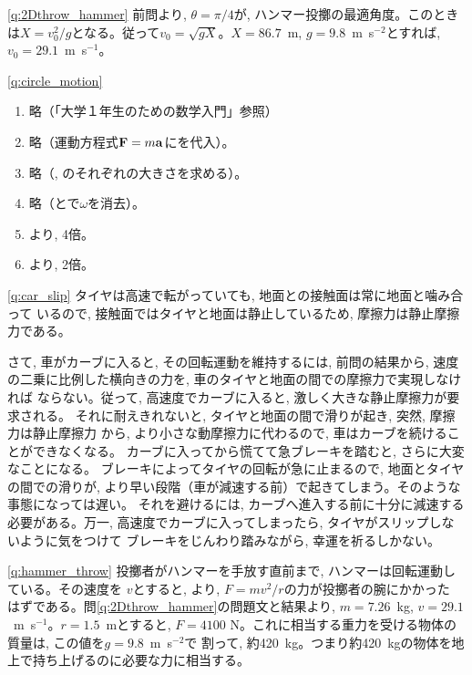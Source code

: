 \ref{q:2Dthrow_hammer}
前問より, $\theta=\pi/4$が, ハンマー投擲の最適角度。このとき
は$X=v_0^2/g$となる。従って$v_0=\sqrt{gX}$。$X=86.7$~m, 
$g=9.8$~m~s$^{-2}$とすれば, $v_0=29.1$~m~s$^{-1}$。
\mv


\ref{q:circle_motion}
\begin{enumerate}
\item 略（「大学１年生のための数学入門」参照）
\item 略（運動方程式${\bf F}=m{\bf a}$にを代入）。
\item 略（, のそれぞれの大きさを求める）。
\item 略（とで$\omega$を消去）。
\item {}より, 4倍。
\item {}より, 2倍。
\end{enumerate}
\mv

%
\ref{q:car_slip}
タイヤは高速で転がっていても, 地面との接触面は常に地面と噛み合って
いるので, 接触面ではタイヤと地面は静止しているため, 摩擦力は静止摩擦力である。

さて, 車がカーブに入ると, その回転運動を維持するには, 前問の結果から, 
速度の二乗に比例した横向きの力を, 車のタイヤと地面の間での摩擦力で実現しなければ
ならない。従って, 高速度でカーブに入ると, 激しく大きな静止摩擦力が要求される。
それに耐えきれないと, タイヤと地面の間で滑りが起き, 突然, 摩擦力は静止摩擦力
から, より小さな動摩擦力に代わるので, 車はカーブを続けることができなくなる。
カーブに入ってから慌てて急ブレーキを踏むと, さらに大変なことになる。
ブレーキによってタイヤの回転が急に止まるので, 地面とタイヤの間での滑りが, 
より早い段階（車が減速する前）で起きてしまう。そのような事態になっては遅い。
それを避けるには, カーブへ進入する前に十分に減速する必要がある。万一, 
高速度でカーブに入ってしまったら, タイヤがスリップしないように気をつけて
ブレーキをじんわり踏みながら, 幸運を祈るしかない。
\mv

%
\ref{q:hammer_throw}
投擲者がハンマーを手放す直前まで, ハンマーは回転運動している。その速度を
$v$とすると, より, $F=mv^2/r$の力が投擲者の腕にかかった
はずである。問\ref{q:2Dthrow_hammer}の問題文と結果より, $m=7.26$~kg, $v=29.1$~m~s$^{-1}$。$r=1.5$~mとすると, 
$F=4100$ N。これに相当する重力を受ける物体の質量は, この値を$g=9.8$~m~s$^{-2}$で
割って, 約420~kg。つまり約420~kgの物体を地上で持ち上げるのに必要な力に相当する。
\mv

